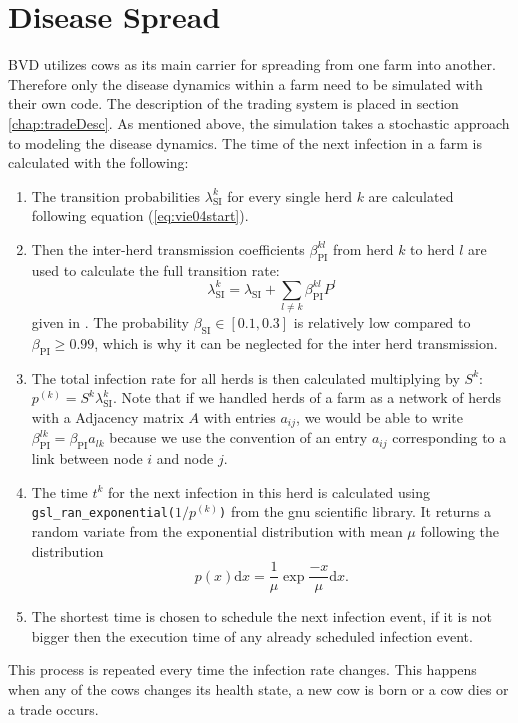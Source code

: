 \section{Disease Spread}
BVD utilizes cows as its main carrier for spreading from one farm into another. Therefore only the disease dynamics within a farm need to be simulated with their own code. The description of the trading system is placed in section \ref{chap:tradeDesc}. As mentioned above, the simulation takes a stochastic approach to modeling the disease dynamics. The time of the next infection in a farm is calculated with the following: \\
\begin{enumerate}
\item The transition probabilities $\lambda_\text{SI}^k$ for every single herd $k$ are calculated following equation (\ref{eq:vie04start}).
\item Then the inter-herd transmission coefficients $\beta^{kl}_\text{PI}$ from herd $k$ to herd $l$ are used to calculate the full transition rate:
\begin{equation}
\lambda_\text{SI}^k = \lambda_\text{SI} + \sum_{l \neq k} \beta^{kl}_\text{PI} P^l \label{eq:vie04}
\end{equation}
given in \citep{VIE04}. The probability $\beta_\text{SI} \in [0.1,0.3] $ is relatively low compared to $\beta_\text{PI} \geq 0.99$, which is why it can be neglected for the inter herd transmission.
\item The total infection rate for all herds is then calculated multiplying by $S^k$: $p^{(k)} = S^k \lambda_\text{SI}^k $. Note that if we handled herds of a farm as a network of herds with a Adjacency matrix $A$ with entries $a_{ij}$, we would be able to write $\beta_\text{PI}^{lk}= \beta_\text{PI} a_{lk}$ because we use the convention of an entry $a_{ij}$ corresponding to a link between node $i$ and node $j$.
\item The time $t^k$ for the next infection in this herd is calculated using\\ {\tt gsl\_ran\_exponential($1/p^{(k)}$)} from the gnu scientific library. \glqq It returns a random variate from the exponential distribution with mean $\mu$\grqq \citep{webExponentialDistrib} following the distribution 
\begin{equation}
p(x)\text{d}x = \frac{1}{\mu} \exp{\frac{-x}{\mu}}\text{d}x.
\end{equation}

\item The shortest time is chosen to schedule the next infection event, if it is not bigger then the execution time of any already scheduled infection event.
\end{enumerate}
This process is repeated every time the infection rate changes. This happens when any of the cows changes its health state, a new cow is born or a cow dies or a trade occurs. 

